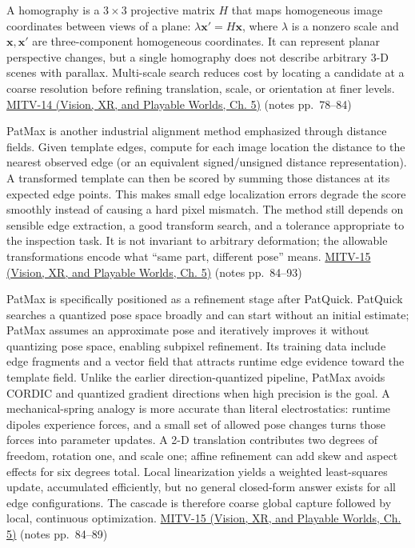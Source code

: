 A homography is a \(3\times3\) projective matrix \(H\) that maps homogeneous image coordinates between views of a plane: \(\lambda\mathbf{x}'=H\mathbf{x}\), where \(\lambda\) is a nonzero scale and \(\mathbf{x},\mathbf{x}'\) are three-component homogeneous coordinates. It can represent planar perspective changes, but a single homography does not describe arbitrary 3-D scenes with parallax. Multi-scale search reduces cost by locating a candidate at a coarse resolution before refining translation, scale, or orientation at finer levels. \href{../07-Vision-XR-and-Playable-Worlds/main.pdf\#nameddest=04-visual-computing-ii-ch036-mitv-14---inspection-in-patquick-hough-transform-homography-position-determination-multi-scale}{MITV-14 (Vision, XR, and Playable Worlds, Ch. 5)} (notes pp.~78--84)

PatMax is another industrial alignment method emphasized through distance fields. Given template edges, compute for each image location the distance to the nearest observed edge (or an equivalent signed/unsigned distance representation). A transformed template can then be scored by summing those distances at its expected edge points. This makes small edge localization errors degrade the score smoothly instead of causing a hard pixel mismatch. The method still depends on sensible edge extraction, a good transform search, and a tolerance appropriate to the inspection task. It is not invariant to arbitrary deformation; the allowable transformations encode what ``same part, different pose'' means. \href{../07-Vision-XR-and-Playable-Worlds/main.pdf\#nameddest=04-visual-computing-ii-ch036-mitv-15---alignment-patmax-distance-field-filtering-and-sub-sampling-us-7065262}{MITV-15 (Vision, XR, and Playable Worlds, Ch. 5)} (notes pp.~84--93)

PatMax is specifically positioned as a refinement stage after PatQuick. PatQuick searches a quantized pose space broadly and can start without an initial estimate; PatMax assumes an approximate pose and iteratively improves it without quantizing pose space, enabling subpixel refinement. Its training data include edge fragments and a vector field that attracts runtime edge evidence toward the template field. Unlike the earlier direction-quantized pipeline, PatMax avoids CORDIC and quantized gradient directions when high precision is the goal. A mechanical-spring analogy is more accurate than literal electrostatics: runtime dipoles experience forces, and a small set of allowed pose changes turns those forces into parameter updates. A 2-D translation contributes two degrees of freedom, rotation one, and scale one; affine refinement can add skew and aspect effects for six degrees total. Local linearization yields a weighted least-squares update, accumulated efficiently, but no general closed-form answer exists for all edge configurations. The cascade is therefore coarse global capture followed by local, continuous optimization. \href{../07-Vision-XR-and-Playable-Worlds/main.pdf\#nameddest=04-visual-computing-ii-ch036-mitv-15---alignment-patmax-distance-field-filtering-and-sub-sampling-us-7065262}{MITV-15 (Vision, XR, and Playable Worlds, Ch. 5)} (notes pp.~84--89)

